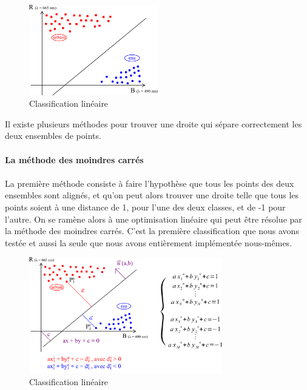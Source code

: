 \documentclass[a4paper,10pt]{article}
\begin{document}
\begin{figure}[H]
  \centering
    \includegraphics[width=0.5\textwidth]{ml_lin.png}
  \caption{Classification linéaire}
  \label{fig:ml_lin}
\end{figure}

Il existe plusieurs méthodes pour trouver une droite qui sépare correctement les deux ensembles de points.

\paragraph{La méthode des moindres carrés}
\paragraph{}
  La première méthode consiste à faire l'hypothèse que tous les points des deux ensembles sont alignés, et qu'on peut alors trouver une droite telle que tous les points soient à une distance de 1, pour l'une des deux classes, et de -1 pour l'autre. On se ramène alors à une optimisation linéaire qui peut être résolue par la méthode des moindres carrés.
  C'est la première classification que nous avons testée et aussi la seule que nous avons entièrement implémentée nous-mêmes. 
  
  \begin{figure}[H]
  \centering
    \includegraphics[width=0.75\textwidth]{ml_lse}
  \caption{Classification linéaire}
  \label{fig:ml_lse}
\end{figure}
  
\end{document}
